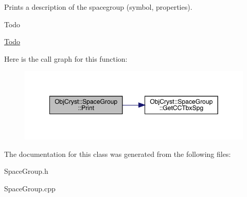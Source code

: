 Prints a description of the spacegroup (symbol, properties).

\begin{DoxyRefDesc}{Todo}
\item[\mbox{\hyperlink{todo__todo000015}{Todo}}]\end{DoxyRefDesc}
Here is the call graph for this function\+:
\nopagebreak
\begin{figure}[H]
\begin{center}
\leavevmode
\includegraphics[width=349pt]{class_obj_cryst_1_1_space_group_a3c71572bb11403564630db165a5ed1cc_cgraph}
\end{center}
\end{figure}


The documentation for this class was generated from the following files\+:\begin{DoxyCompactItemize}
\item 
Space\+Group.\+h\item 
Space\+Group.\+cpp\end{DoxyCompactItemize}
